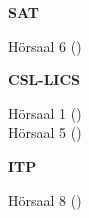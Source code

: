 \documentclass{article}
\begin{document}

\vspace{2cm}

\begin{center}
\begin{vsltext}{2.5cm}{3.5cm}

    \textbf{SAT}\\

\end{vsltext}

\begin{vsltext}{1.5cm}{2cm}

    Hörsaal 6 (\AreaA)

\end{vsltext}

    \vspace{2cm}

\begin{vsltext}{2.5cm}{3.5cm}

    \textbf{CSL-LICS}\\

\end{vsltext}
\begin{vsltext}{1.5cm}{2cm}

    Hörsaal 1 (\AreaC)\\
    Hörsaal 5 (\AreaA)

\end{vsltext}

    \vspace{2cm}

\begin{vsltext}{2.5cm}{3.5cm}
    
    \textbf{ITP}\\

\end{vsltext}
\begin{vsltext}{1.5cm}{2cm}

    Hörsaal 8 (\AreaB)

\end{vsltext}
\end{center}
\end{document}
